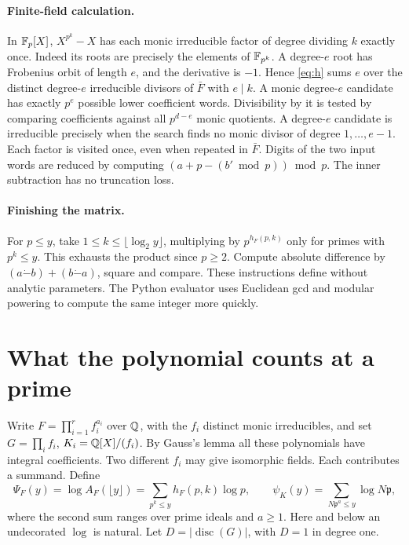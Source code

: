 \documentclass[11pt]{article}
\newcommand{\disc}{\operatorname{disc}}\newcommand{\RH}{\mathsf{RH}}\newcommand{\GRH}{\mathsf{GRH}}\newcommand{\ERH}{\mathsf{ERH}}
\begin{document}
\paragraph{Finite-field calculation.}
In \(\mathbb F_p[X]\), \(X^{p^k}-X\) has each monic irreducible factor of degree dividing \(k\) exactly once. Indeed its roots are precisely the elements of \(\mathbb F_{p^k}\). A degree-\(e\) root has Frobenius orbit of length \(e\), and the derivative is \(-1\). Hence \eqref{eq:h} sums \(e\) over the distinct degree-\(e\) irreducible divisors of \(\bar F\) with \(e\mid k\). A monic degree-\(e\) candidate has exactly \(p^e\) possible lower coefficient words. Divisibility by it is tested by comparing coefficients against all \(p^{d-e}\) monic quotients. A degree-\(e\) candidate is irreducible precisely when the search finds no monic divisor of degree \(1,\ldots,e-1\). Each factor is visited once, even when repeated in \(\bar F\). Digits of the two input words are reduced by computing \((a+p-(b'\bmod p))\bmod p\). The inner subtraction has no truncation loss.

\paragraph{Finishing the matrix.}
For \(p\le y\), take \(1\le k\le\lfloor\log_2 y\rfloor\), multiplying by \(p^{h_F(p,k)}\) only for primes with \(p^k\le y\). This exhausts the product since \(p\ge2\). Compute absolute difference by \((a\mathbin{\dot-}b)+(b\mathbin{\dot-}a)\), square and compare. These instructions define  without analytic parameters. The Python evaluator uses Euclidean gcd and modular powering to compute the same integer more quickly.
\newpage
\section{What the polynomial counts at a prime}\label{sec:local}
Write \(F=\prod_{i=1}^r f_i^{a_i}\) over \(\mathbb Q\), with the \(f_i\) distinct monic irreducibles, and set \(G=\prod_i f_i\), \(K_i=\mathbb Q[X]/(f_i)\). By Gauss's lemma all these polynomials have integral coefficients. Two different \(f_i\) may give isomorphic fields. Each contributes a summand. Define
\[
 \Psi_F(y)=\log A_F(\lfloor y\rfloor)
   =\sum_{p^k\le y}h_F(p,k)\log p,\qquad
 \psi_K(y)=\sum_{N\mathfrak p^a\le y}\log N\mathfrak p ,
\]
where the second sum ranges over prime ideals and \(a\ge1\). Here and below an undecorated \(\log\) is natural. Let \(D=|\disc(G)|\), with \(D=1\) in degree one.
\end{document}
